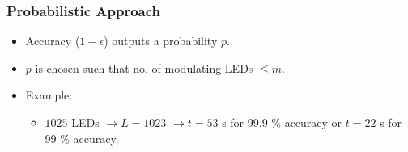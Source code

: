 \documentclass{beamer}
\begin{document}
	



	\begin{frame}\frametitle{Probabilistic Approach}


		\begin{itemize}
			\item Accuracy ($1 - \epsilon$) outputs a probability $p$.
			\item $p$ is chosen such that no. of modulating LEDs $\le m$.
			\item Example:
				\begin{itemize}
					\item $1025$ LEDs $\rightarrow L = 1023$ $\rightarrow t = 53$ s for 99.9 \% accuracy or $t = 22$ s for 99 \% accuracy.
				\end{itemize}
		\end{itemize}

		
	\end{frame}
\end{document}
